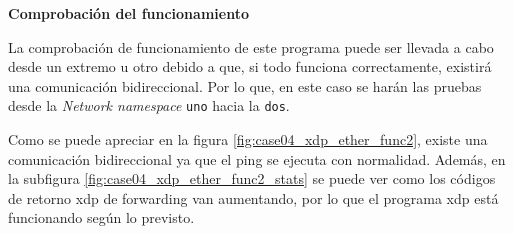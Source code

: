 \vspace{1cm}
\textbf{Comprobación del funcionamiento}\\
\par
La comprobación de funcionamiento de este programa puede ser llevada a cabo desde un extremo u otro debido a que, si todo funciona correctamente, existirá una comunicación bidireccional. Por lo que, en este caso se harán las pruebas desde la \textit{Network namespace} \texttt{uno} hacia la \texttt{dos}.\\
\par
Como se puede apreciar en la figura \ref{fig:case04_xdp_ether_func2}, existe una comunicación bidireccional ya que el ping \hspace{1mm} se ejecuta con normalidad. Además, en la subfigura \ref{fig:case04_xdp_ether_func2_stats} se puede ver como los códigos de retorno \gls{xdp} de forwarding van aumentando, por lo que el programa \gls{xdp} está funcionando según lo previsto.


